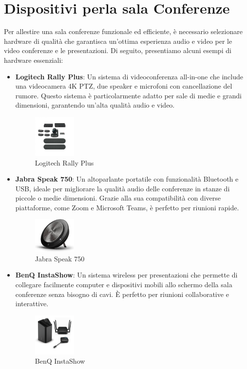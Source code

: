\documentclass{assignment}
\begin{document}
\section{Dispositivi perla sala Conferenze}

Per allestire una sala conferenze funzionale ed efficiente, è necessario selezionare hardware di qualità che garantisca un'ottima esperienza audio e video per le video conferenze e le presentazioni. Di seguito, presentiamo alcuni esempi di hardware essenziali:

\begin{itemize}
    \item \textbf{Logitech Rally Plus}: Un sistema di videoconferenza all-in-one che include una videocamera 4K PTZ, due speaker e microfoni con cancellazione del rumore. Questo sistema è particolarmente adatto per sale di medie e grandi dimensioni, garantendo un'alta qualità audio e video.
    \begin{figure}[H]
        \centering
        \includegraphics[width=0.2\textwidth]{assets/logitech_rally_plus.jpg}
        \caption{Logitech Rally Plus}
    \end{figure}

    \item \textbf{Jabra Speak 750}: Un altoparlante portatile con funzionalità Bluetooth e USB, ideale per migliorare la qualità audio delle conferenze in stanze di piccole o medie dimensioni. Grazie alla sua compatibilità con diverse piattaforme, come Zoom e Microsoft Teams, è perfetto per riunioni rapide.
    \begin{figure}[H]
        \centering
        \includegraphics[width=0.2\textwidth]{assets/jabra_speak_750.jpg}
        \caption{Jabra Speak 750}
    \end{figure}

    \item \textbf{BenQ InstaShow}: Un sistema wireless per presentazioni che permette di collegare facilmente computer e dispositivi mobili allo schermo della sala conferenze senza bisogno di cavi. È perfetto per riunioni collaborative e interattive.
    \begin{figure}[H]
        \centering
        \includegraphics[width=0.2\textwidth]{assets/benq_instashow.png}
        \caption{BenQ InstaShow}
    \end{figure}


\end{itemize}
\end{document}
